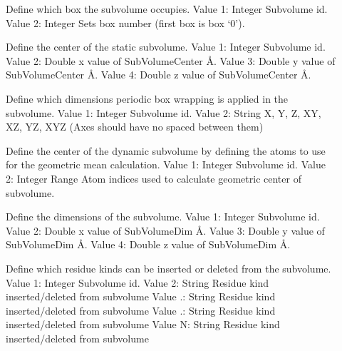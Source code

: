 \documentclass[letterpaper,10pt,english]{sphinxmanual}
\begin{document}
\begin{description}
\item[{}] \leavevmode
\sphinxAtStartPar
Define which box the subvolume occupies.
\sphinxhyphen{} Value 1: Integer \sphinxhyphen{} Sub\sphinxhyphen{}volume id.
\sphinxhyphen{} Value 2: Integer \sphinxhyphen{} Sets box number (first box is box ‘0’).

\item[{}] \leavevmode
\sphinxAtStartPar
Define the center of the static subvolume.
\sphinxhyphen{} Value 1: Integer \sphinxhyphen{} Sub\sphinxhyphen{}volume id.
\sphinxhyphen{} Value 2: Double \sphinxhyphen{} x value of SubVolumeCenter \(Å\).
\sphinxhyphen{} Value 3: Double \sphinxhyphen{} y value of SubVolumeCenter \(Å\).
\sphinxhyphen{} Value 4: Double \sphinxhyphen{} z value of SubVolumeCenter \(Å\).

\item[{}] \leavevmode
\sphinxAtStartPar
Define which dimensions periodic box wrapping is applied in the subvolume.
\sphinxhyphen{} Value 1: Integer \sphinxhyphen{} Sub\sphinxhyphen{}volume id.
\sphinxhyphen{} Value 2: String \sphinxhyphen{} X, Y, Z, XY, XZ, YZ, XYZ (Axes should have no spaced between them)

\item[{}] \leavevmode
\sphinxAtStartPar
Define the center of the dynamic subvolume by defining the atoms to use for the geometric mean calculation.
\sphinxhyphen{} Value 1: Integer \sphinxhyphen{} Sub\sphinxhyphen{}volume id.
\sphinxhyphen{} Value 2: Integer Range \sphinxhyphen{} Atom indices used to calculate geometric center of subvolume.

\item[{}] \leavevmode
\sphinxAtStartPar
Define the dimensions of the subvolume.
\sphinxhyphen{} Value 1: Integer \sphinxhyphen{} Sub\sphinxhyphen{}volume id.
\sphinxhyphen{} Value 2: Double \sphinxhyphen{} x value of SubVolumeDim \(Å\).
\sphinxhyphen{} Value 3: Double \sphinxhyphen{} y value of SubVolumeDim \(Å\).
\sphinxhyphen{} Value 4: Double \sphinxhyphen{} z value of SubVolumeDim \(Å\).

\item[{}] \leavevmode
\sphinxAtStartPar
Define which residue kinds can be inserted or deleted from the subvolume.
\sphinxhyphen{} Value 1: Integer \sphinxhyphen{} Sub\sphinxhyphen{}volume id.
\sphinxhyphen{} Value 2: String \sphinxhyphen{} Residue kind inserted/deleted from subvolume
\sphinxhyphen{} Value .: String \sphinxhyphen{} Residue kind inserted/deleted from subvolume
\sphinxhyphen{} Value .: String \sphinxhyphen{} Residue kind inserted/deleted from subvolume
\sphinxhyphen{} Value N: String \sphinxhyphen{} Residue kind inserted/deleted from subvolume


\end{description}
\end{document}
